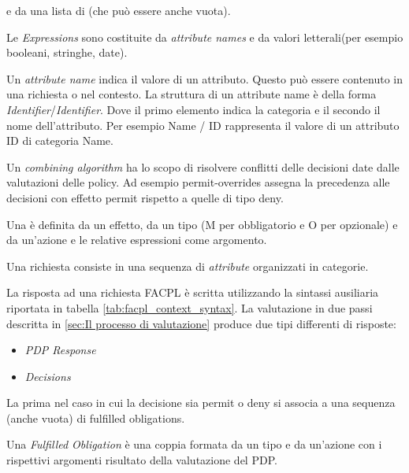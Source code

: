 e da una lista di \eObligations(che può essere anche vuota). \par
Le \emph{Expressions} sono costituite da \emph{attribute names} e da valori letterali(per esempio booleani, stringhe, date).\par
Un \emph{attribute name} indica il valore di un attributo. Questo può essere contenuto in una richiesta o nel contesto. La
struttura di un attribute name è della forma \emph{Identifier}/\emph{Identifier}. Dove il primo elemento indica la categoria
e il secondo il nome dell'attributo. Per esempio Name / ID rappresenta il valore di un attributo ID di categoria Name.\par
Un \emph{combining algorithm} ha lo scopo di risolvere conflitti delle decisioni date dalle valutazioni delle policy.
Ad esempio permit-overrides assegna la precedenza alle decisioni con effetto permit rispetto a quelle di tipo deny.\par
Una \eObligation è definita da un effetto, da un tipo (M per obbligatorio e O per opzionale) e da un'azione e le relative
espressioni come argomento.\par

Una richiesta consiste in una sequenza di \emph{attribute} organizzati in categorie.\par
La risposta ad una richiesta \ac{FACPL} è scritta utilizzando la sintassi ausiliaria riportata in tabella \ref{tab:facpl_context_syntax}.
La valutazione in due passi descritta in \ref{sec:Il processo di valutazione} produce due tipi differenti di risposte:
\begin{itemize}
  \renewcommand\labelitemi{--}
  \item \emph{\ac{PDP} Response}
  \item \emph{Decisions}
\end{itemize}
La prima nel caso in cui la decisione sia permit o deny si associa a una sequenza (anche vuota) di fulfilled obligations.\par
Una \emph{Fulfilled Obligation} è una coppia formata da un tipo e da un'azione con i rispettivi argomenti risultato della
valutazione del \ac{PDP}.



